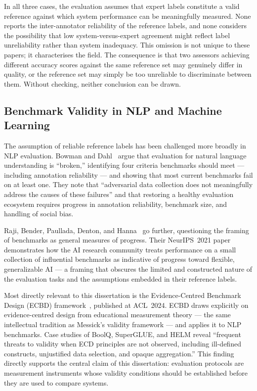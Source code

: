 In all three cases, the evaluation assumes that expert labels constitute a
valid reference against which system performance can be meaningfully measured.
None reports the inter-annotator reliability of the reference labels, and none
considers the possibility that low system-versus-expert agreement might
reflect label unreliability rather than system inadequacy.  This omission is
not unique to these papers; it characterises the field.  The consequence is
that two assessors achieving different accuracy scores against the same
reference set may genuinely differ in quality, or the reference set may
simply be too unreliable to discriminate between them.  Without checking,
neither conclusion can be drawn.

\subsection{Benchmark Validity in NLP and Machine Learning}

The assumption of reliable reference labels has been challenged more broadly
in NLP evaluation.  Bowman and Dahl~\cite{bowman2021} argue that evaluation
for natural language understanding is ``broken,'' identifying four criteria
benchmarks should meet --- including annotation reliability --- and showing
that most current benchmarks fail on at least one.  They note that
``adversarial data collection does not meaningfully address the causes of
these failures'' and that restoring a healthy evaluation ecosystem requires
progress in annotation reliability, benchmark size, and handling of social
bias.

Raji, Bender, Paullada, Denton, and Hanna~\cite{raji2021} go further,
questioning the framing of benchmarks as general measures of progress.
Their NeurIPS~2021 paper demonstrates how the AI research community treats
performance on a small collection of influential benchmarks as indicative of
progress toward flexible, generalizable AI --- a framing that obscures the
limited and constructed nature of the evaluation tasks and the assumptions
embedded in their reference labels.

Most directly relevant to this dissertation is the Evidence-Centred Benchmark
Design (ECBD) framework~\cite{ecbd2024}, published at ACL~2024.  ECBD draws
explicitly on evidence-centred design from educational measurement theory ---
the same intellectual tradition as Messick's validity framework
\cite{messick1995} --- and applies it to NLP benchmarks.  Case studies of
BoolQ, SuperGLUE, and HELM reveal ``frequent threats to validity when
ECD principles are not observed, including ill-defined constructs, unjustified
data selection, and opaque aggregation.''  This finding directly supports the
central claim of this dissertation: evaluation protocols are measurement
instruments whose validity conditions should be established before they are
used to compare systems.

